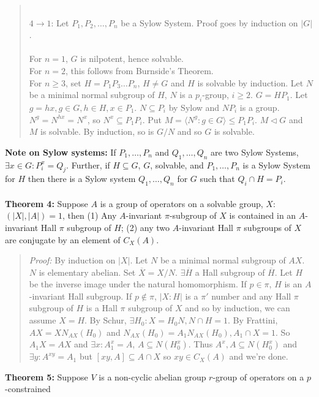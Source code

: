 \begin{quote}
\\
$4 \rightarrow 1$:
Let $P_1, P_2 , \ldots , P_n$ be a Sylow System.  Proof goes by induction on $|G|$.
\\
\\
For $n=1$, $G$ is nilpotent, hence solvable.
\\
For $n=2$, this follows from Burnside's Theorem.
\\
For $n \ge 3$, set $H= P_1 P_3 \ldots P_n$, $H \ne G$ and $H$ is solvable by
induction.  Let $N$ be a minimal normal subgroup of $H$, $N$ is a $p_i$-group,
$i \ge 2$.  $G= H P_1$.  Let $g= hx, g \in G, h \in H, x \in P_1$.
$N \subseteq P_i$ by Sylow and $N P_i$ is a group.  $N^g= N^{hx}= N^x$,
so $N^x \subseteq P_1 P_i$.   Put $M= \langle N^g : g \in G \rangle \le P_1 P_i$.
$M \lhd G$ and $M$ is solvable.  By induction, so is $G/N$ and so $G$ is solvable.
\end{quote}
{\bf Note on Sylow systems:}  If 
$P_1, \ldots, P_n$ and
$Q_1, \ldots, Q_n$ are two Sylow Systems, $\exists x \in G: P_i^x= Q_j$.  Further,
if $H \subseteq G$, $G$, solvable, and
$P_1, \ldots, P_n$ is a Sylow System for $H$ then there is a Sylow system
$Q_1, \ldots, Q_n$ for $G$ such that $Q_i \cap H = P_i$.
\\
\\
{\bf Theorem 4:}
Suppose $A$ is a group of operators on a solvable group, $X$: $(|X|, |A|) = 1$, then
(1) Any $A$-invariant $\pi$-subgroup of $X$ is contained in an $A$-invariant Hall $\pi$ subgroup of $H$; 
(2) any two $A$-invariant Hall $\pi$ subgroups of $X$ are conjugate by an element
of $C_X(A)$.
\begin{quote}
\emph{Proof:}
By induction on $|X|$.
Let $N$ be a minimal normal subgroup of $AX$.  $N$ is elementary abelian.  Set
${\overline X}= X/N$.  $\exists {\overline H}$ a Hall subgroup of ${\overline H}$.
Let $H$ be the inverse image under the natural homomorphism.
If $p \in \pi$, $H$ is an $A$-invariant Hall subgroup.
If $p \notin \pi$, $|X:H|$ is a $\pi'$ number and any Hall $\pi$ subgroup of $H$
is a Hall $\pi$ subgroup of $X$ and so by induction, we can assume $X=H$.
By Schur, $\exists H_0: X= H_0N, N \cap H = 1$.  By Frattini,
$AX= X N_{AX}(H_0)$ and
$N_{AX}(H_0)= A_1 N_{AX}(H_0), A_1 \cap X = 1$.  So $A_1X= AX$ and $\exists x: A_1^x=A$,
$A \subseteq N(H_0^x)$.  Thus $A^x, A \subseteq N(H_0^x)$ and $\exists y: A^{xy}=A_1$
but $[xy, A] \subseteq A \cap X$ so $xy \in C_X(A)$ and we're done.

\end{quote}
{\bf Theorem 5:}
Suppose $V$ is a non-cyclic abelian group $r$-group of operators on a $p$-constrained
